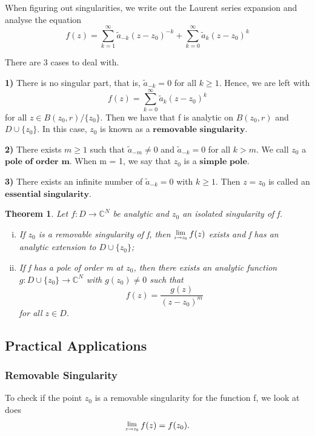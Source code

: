 \documentclass[twoside]{article}
\newcounter{lecnum}
\newcommand{\Lim}[1]{\raisebox{0.5ex}{\scalebox{0.8}{$\displaystyle \lim_{#1}\;$}}}
\newtheorem{theorem}{Theorem}[lecnum]
\begin{document}
When figuring out singularities, we write out the Laurent series expansion and analyse the equation
$$
f(z) = \sum_{k=1}^{\infty}\tilde{a}_{-k}(z - z_0)^{-k} + \sum_{k=0}^{\infty}\tilde{a}_{k}(z - z_0)^{k}
$$

There are 3 cases to deal with.

\bigskip
\textbf{1)} There is no singular part, that is, $\tilde{a}_{-k} = 0$ for all $k \geq 1$. Hence, we are left with
$$
f(z) = \sum_{k=0}^{\infty}\tilde{a}_{k}(z - z_0)^{k}
$$
for all $z \in B(z_0, r) / \{z_0\}$. Then we have that f is analytic on $B(z_0,r)$ and $D \cup \{z_0\}$. In this case, $z_0$ is known as a $\textbf{removable singularity}$.

\bigskip
\textbf{2)} There exists $m \geq 1$ such that $\tilde{a}_{-m} \neq 0$ and $\tilde{a}_{-k} = 0$ for all $k > m$. We call $z_0$ a $\textbf{pole of order m}$. When m = 1, we say that $z_0$ is a $\textbf{simple pole}$. 

\bigskip
\textbf{3)} There exists an infinite number of $\tilde{a}_{-k}=0$ with $k \geq 1$. Then $z = z_0$ is called an $\textbf{essential singularity}$.

\begin{theorem} Let $f: D \rightarrow \mathbb{C}^N$ be analytic and $z_0$ an isolated singularity of f. 

\begin{enumerate}[(i)]
  \item If $z_0$ is a removable singularity of f, then $\Lim{z \rightarrow z_0}f(z)$ exists and f has an analytic extension to $D \cup \{z_0\}$;
  \item If f has a pole of order m at $z_0$, then there exists an analytic function $g: D \cup \{z_0\} \rightarrow \mathbb{C}^N$ with $g(z_0) \neq 0$ such that 
  $$
  f(z) = \frac{g(z)}{(z - z_0)^m}
  $$
  for all $z \in D$.
\end{enumerate}
\end{theorem}

\subsection{Practical Applications}
\subsubsection{Removable Singularity} 
To check if the point $z_0$ is a removable singularity for the function f, we look at does
$$
\Lim{z \rightarrow z_0}f(z) = f(z_0).
$$
\end{document}
